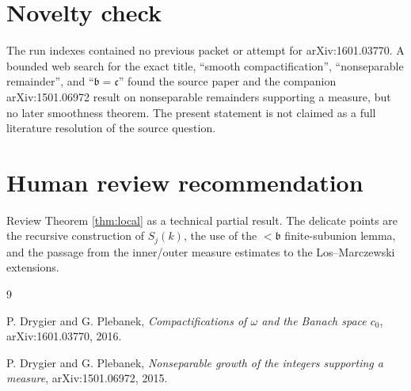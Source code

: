 \documentclass[11pt]{amsart}
\theoremstyle{definition}
\begin{document}
\section*{Novelty check}

The run indexes contained no previous packet or attempt for arXiv:1601.03770.
A bounded web search for the exact title, ``smooth compactification'',
``nonseparable remainder'', and ``\(\mathfrak b=\mathfrak c\)'' found the source
paper and the companion arXiv:1501.06972 result on nonseparable remainders
supporting a measure, but no later smoothness theorem.  The present statement is
not claimed as a full literature resolution of the source question.

\section*{Human review recommendation}

Review Theorem \ref{thm:local} as a technical partial result.  The delicate
points are the recursive construction of \(S_j(k)\), the use of the
\(<\mathfrak b\) finite-subunion lemma, and the passage from the inner/outer
measure estimates to the Los--Marczewski extensions.

\begin{thebibliography}{9}

P. Drygier and G. Plebanek,
\emph{Compactifications of \(\omega\) and the Banach space \(c_0\)},
arXiv:1601.03770, 2016.

P. Drygier and G. Plebanek,
\emph{Nonseparable growth of the integers supporting a measure},
arXiv:1501.06972, 2015.

\end{thebibliography}
\end{document}
